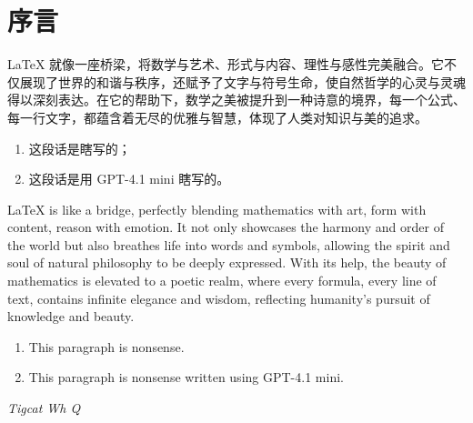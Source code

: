 \chapter*{\centering 序言}
LaTeX 就像一座桥梁，将数学与艺术、形式与内容、理性与感性完美融合。它不仅展现了世界的和谐与秩序，还赋予了文字与符号生命，使自然哲学的心灵与灵魂得以深刻表达。在它的帮助下，数学之美被提升到一种诗意的境界，每一个公式、每一行文字，都蕴含着无尽的优雅与智慧，体现了人类对知识与美的追求。

\begin{enumerate}
	\item 这段话是瞎写的；
	\item 这段话是用 GPT-4.1 mini 瞎写的。
\end{enumerate}

LaTeX is like a bridge, perfectly blending mathematics with art, form with content, reason with emotion. It not only showcases the harmony and order of the world but also breathes life into words and symbols, allowing the spirit and soul of natural philosophy to be deeply expressed. With its help, the beauty of mathematics is elevated to a poetic realm, where every formula, every line of text, contains infinite elegance and wisdom, reflecting humanity's pursuit of knowledge and beauty.

\begin{enumerate}
	\item This paragraph is nonsense.
	\item This paragraph is nonsense written using GPT-4.1 mini.
\end{enumerate}

\begin{flushright}
	\textit{Tigcat Wh Q}
\end{flushright}
